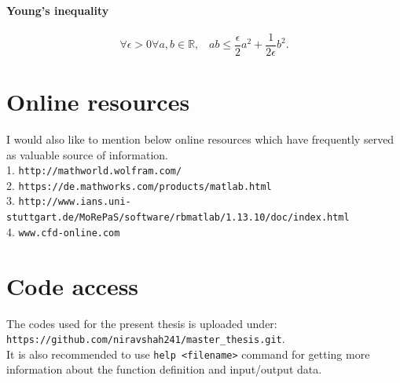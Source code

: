 \documentclass[a4paper,twoside,openright]{book}
\begin{document}
\begin{appendices}
\subsubsection{Young's inequality} 
\begin{equation}
\forall \epsilon > 0 \forall a,b \in \mathbb{R} \textrm{,} \quad ab \leq \frac{\epsilon}{2}a^2 + \frac{1}{2 \epsilon}b^2 \textrm{.}
\end{equation}

\chapter{Online resources}

I would also like to mention below online resources which have frequently served as valuable source of information.
\\
1. \texttt{http://mathworld.wolfram.com/}\\
2. \texttt{https://de.mathworks.com/products/matlab.html}\\
3. \texttt{http://www.ians.uni-stuttgart.de/MoRePaS/software/rbmatlab/1.13.10/\linebreak doc/index.html}\\
4. \texttt{www.cfd-online.com}\\

\chapter{Code access}

The codes used for the present thesis is uploaded under: \\
\texttt{https://github.com/niravshah241/master\_thesis.git}.\\
It is also recommended to use \verb|help <filename>| command for getting more information about the function definition and input/output data.




\end{appendices}
\end{document}
